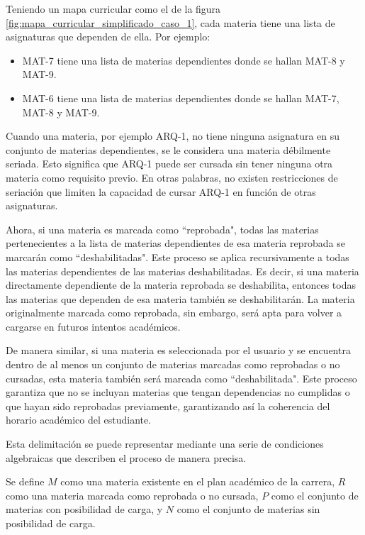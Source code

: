 Teniendo un mapa curricular como el de la figura \ref{fig:mapa_curricular_simplificado_caso_1}, cada materia tiene una lista de asignaturas que dependen de ella. Por ejemplo: %
\begin{itemize}
    \item MAT-7 tiene una lista de materias dependientes donde se hallan MAT-8 y MAT-9.
    \item MAT-6 tiene una lista de materias dependientes donde se hallan MAT-7, MAT-8 y MAT-9.
\end{itemize}

Cuando una materia, por ejemplo ARQ-1, no tiene ninguna asignatura en su conjunto de materias dependientes, se le considera una materia débilmente seriada. Esto significa que ARQ-1 puede ser cursada sin tener ninguna otra materia como requisito previo. En otras palabras, no existen restricciones de seriación que limiten la capacidad de cursar ARQ-1 en función de otras asignaturas.

Ahora, si una materia es marcada como ``reprobada", todas las materias pertenecientes a la lista de materias dependientes de esa materia reprobada se marcarán como ``deshabilitadas". Este proceso se aplica recursivamente a todas las materias dependientes de las materias deshabilitadas. Es decir, si una materia directamente dependiente de la materia reprobada se deshabilita, entonces todas las materias que dependen de esa materia también se deshabilitarán. La materia originalmente marcada como reprobada, sin embargo, será apta para volver a cargarse en futuros intentos académicos.
    
De manera similar, si una materia es seleccionada por el usuario y se encuentra dentro de al menos un conjunto de materias marcadas como reprobadas o no cursadas, esta materia también será marcada como ``deshabilitada". Este proceso garantiza que no se incluyan materias que tengan dependencias no cumplidas o que hayan sido reprobadas previamente, garantizando así la coherencia del horario académico del estudiante.

Esta delimitación se puede representar mediante una serie de condiciones algebraicas que describen el proceso de manera precisa.

Se define \( M \) como una materia existente en el plan académico de la carrera, \( R \) como una materia marcada como reprobada o no cursada, \( P \) como el conjunto de materias con posibilidad de carga, y \( N \) como el conjunto de materias sin posibilidad de carga.

